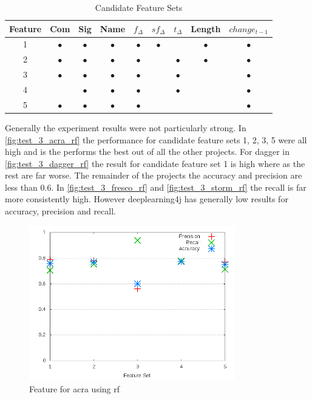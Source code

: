 \begin{table}[h]
\begin{center}

    \begin{tabular}{|c|c|c|c|c|c|c|c|c|}
        \hline
        Feature & Com & Sig & Name & $f_{\Delta}$ & $sf_{\Delta}$ & $t_\Delta$ & Length & $change_{t-1}$ \\
         \hline
        1 & $\bullet$ & $\bullet$ & $\bullet$ & $\bullet$ & $\bullet$ & & $\bullet$ & $\bullet$ \\
        2 & $\bullet$ & $\bullet$ & $\bullet$ & $\bullet$ & & $\bullet$ & $\bullet$ & $\bullet$ \\
        3 & $\bullet$ & $\bullet$ & $\bullet$ & $\bullet$ & & $\bullet$ & & $\bullet$ \\
        4 & & $\bullet$ & $\bullet$ & $\bullet$ & & $\bullet$ & & $\bullet$ \\
        5 & $\bullet$ & $\bullet$ & $\bullet$ & $\bullet$ & & & & $\bullet$ \\ \hline
    \end{tabular}
    \caption{Candidate Feature Sets}
    \label{tab:rf_feature_experiment_sets}
\end{center}

\end{table}

Generally the experiment results were not particularly strong. In \autoref{fig:test_3_acra_rf} the performance for candidate feature sets 1, 2, 3, 5 were all high and is the performs the best out of all the other projects. For dagger in \autoref{fig:test_3_dagger_rf} the result for candidate feature set 1 is high where as the rest are far worse. The remainder of the projects the accuracy and precision are less than $0.6$. In \autoref{fig:test_3_fresco_rf} and \autoref{fig:test_3_storm_rf} the recall is far more consistently high. However deeplearning4j has generally low results for accuracy, precision and recall.

\begin{figure}[h]
    \centering
        \includegraphics[width=0.8\textwidth]{images/rf/test_3/acra_sample_range}
        \caption{Feature for acra using \gls{rf}}
        \label{fig:test_3_acra_rf}
\end{figure}

